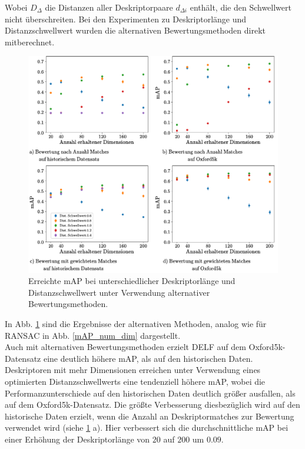 Wobei $D_\Delta$ die Distanzen aller Deskriptorpaare $d_{\Delta i}$ enthält, die den Schwellwert nicht überschreiten.
Bei den Experimenten zu Deskriptorlänge und Distanzschwellwert wurden die alternativen Bewertungsmethoden direkt mitberechnet.
\begin{figure}[h]
\includegraphics[scale=0.73]{mAp_num_dim_scoring_methods}
\caption{Erreichte mAP bei unterschiedlicher Deskriptorlänge und Distanzschwellwert unter Verwendung alternativer Bewertungsmethoden.}
\label{mAP_num_dim_scoring_methods}
\end{figure}
In Abb. \ref{mAP_num_dim_scoring_methods} sind die Ergebnisse der alternativen Methoden, analog wie für RANSAC in Abb. \ref{mAP_num_dim} dargestellt.\\
Auch mit alternativen Bewertungsmethoden erzielt DELF auf dem Oxford5k-Datensatz eine deutlich höhere mAP, als auf den historischen Daten. 
Deskriptoren mit mehr Dimensionen erreichen unter Verwendung eines optimierten Distanzschwellwerts eine tendenziell höhere mAP, wobei die Performanzunterschiede auf den historischen Daten deutlich größer ausfallen, als auf dem Oxford5k-Datensatz. Die größte Verbesserung diesbezüglich wird auf den historische Daten erzielt, wenn die Anzahl an Deskriptormatches zur Bewertung verwendet wird (siehe \ref{mAP_num_dim_scoring_methods} a). Hier verbessert sich die durchschnittliche mAP bei einer Erhöhung der Deskriptorlänge von $20$ auf $200$  um $0.09$.\\

